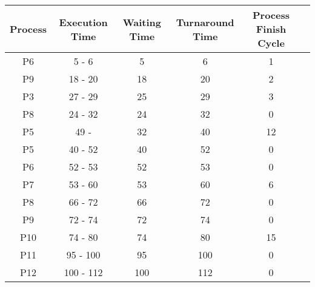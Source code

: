 \documentclass{article}
\begin{document}
\bigskip

\begin{center}
    \begin{tabular}{|c|c|c|c|c|c|}
    \hline
    \rowcolor{darkblue}
    {\textbf{Process}} &{\textbf{Execution Time}} & {\textbf{Waiting Time}} & {\textbf{Turnaround Time}} & {\textbf{Process Finish Cycle}} \\
    \hline
    P6 & 5 - 6 & 5 & 6 & 1 \\
    \hline
    P9 & 18 - 20 & 18 & 20 & 2 \\
    \hline
    P3 & 27 - 29 & 25 & 29 & 3 \\
    \hline
    P8 & 24 - 32 & 24 & 32 & 0 \\
    \hline
    P5 & 49 -  & 32 & 40 & 12 \\
    \hline
    P5 & 40 - 52 & 40 & 52 & 0 \\
    P6 & 52 - 53 & 52 & 53 & 0 \\
    P7 & 53 - 60 & 53 & 60 & 6 \\
    \hline
    P8 & 66 - 72 & 66 & 72 & 0 \\
    P9 & 72 - 74 & 72 & 74 & 0 \\
    P10 & 74 - 80 & 74 & 80 & 15 \\
    \hline
    P11 & 95 - 100 & 95 & 100 & 0 \\
    \hline
    P12 & 100 - 112 & 100 & 112 & 0 \\
    \hline
    \end{tabular}
\end{center}

\newpage
\end{document}

